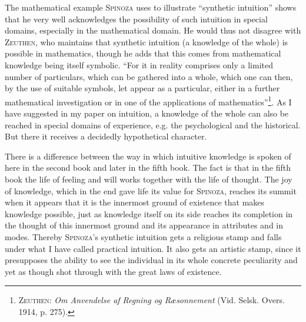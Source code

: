 \documentclass[12pt]{article}
\newcommand{\opage}[1]{\marginnote{\footnotesize\textit{[#1]}}}
\begin{document}
The mathematical example \textsc{Spinoza} uses to illustrate ``synthetic intuition'' shows that
he very well acknowledges the possibility of such intuition in special domains, especially in
the mathematical domain. He would thus not disagree with \textsc{Zeuthen}, who maintains that
synthetic intuition (a knowledge of the whole) is possible in mathematics, though he adds that
this comes from mathematical knowledge being itself symbolic. ``For it in reality comprises
only a limited number of particulars, which can be gathered into a whole, which one can then,
by the use of suitable symbols, let appear as a particular, either in a further mathematical
investigation or in one of the applications of mathematics''\footnote{\textsc{Zeuthen}:
\textit{Om Anvendelse af Regning og Ræsonnement} (Vid. Selsk. Overs. 1914, p. 275).}. As I
have suggested in my paper on intuition, a knowledge of the whole can also be reached in
special domains of experience, e.g. the psychological and the historical. But there it
receives a decidedly hypothetical character.

There is a difference between the way in which intuitive knowledge is spoken of here in the
second book and later in the fifth book. The fact is that in the fifth book the life of feeling
and will works together with the life of thought. The joy of knowledge, which in the end gave
life its value for \textsc{Spinoza}, reaches its summit when it appears that it is the
innermost ground of existence that makes knowledge possible, just as knowledge itself on its
side reaches its completion in the thought of this innermost ground and its appearance in
attributes and in modes. Thereby \textsc{Spinoza}'s synthetic intuition gets a religious stamp
and falls under what I have called practical intuition. It also gets an
ar\opage{54}tistic stamp, since it presupposes the ability to see the individual in its whole
concrete peculiarity and yet as though shot through with the great laws of existence.
\end{document}
